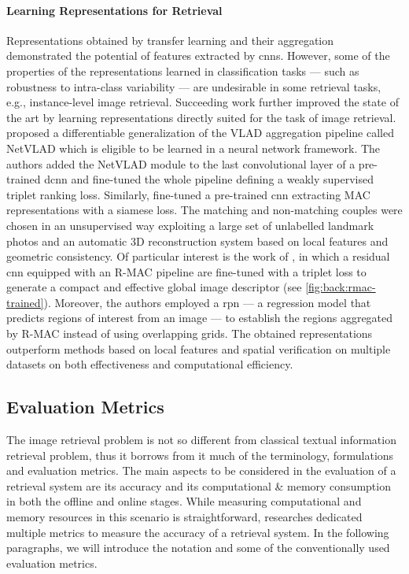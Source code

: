 \paragraph{Learning Representations for Retrieval}
Representations obtained by transfer learning and their aggregation demonstrated the potential of features extracted by \glspl{cnn}.
However, some of the properties of the representations learned in classification tasks --- such as robustness to intra-class variability --- are undesirable in some retrieval tasks, e.g., instance-level image retrieval.
Succeeding work further improved the state of the art by learning representations directly suited for the task of image retrieval.
\citet{arandjelovic2016netvlad} proposed a differentiable generalization of the VLAD aggregation pipeline called NetVLAD which is eligible to be learned in a neural network framework.
The authors added the NetVLAD module to the last convolutional layer of a pre-trained \gls{dcnn} and fine-tuned the whole pipeline defining a weakly supervised triplet ranking loss.
Similarly, \citet{radenovic2016cnn} fine-tuned a pre-trained \gls{cnn} extracting MAC representations with a siamese loss.
The matching and non-matching couples were chosen in an unsupervised way exploiting a large set of unlabelled landmark photos and an automatic 3D reconstruction system based on local features and geometric consistency.
Of particular interest is the work of \citet{gordo2016deep,gordo2017end}, in which a residual \gls{cnn} equipped with an R-MAC pipeline are fine-tuned with a triplet loss to generate a compact and effective global image descriptor (see \ref{fig:back:rmac-trained}).
Moreover, the authors employed a \gls{rpn} --- a regression model that predicts regions of interest from an image --- to establish the regions aggregated by R-MAC instead of using overlapping grids.
The obtained representations outperform methods based on local features and spatial verification on multiple datasets on both effectiveness and computational efficiency.

\subsection{Evaluation Metrics}
\label{subsec:back:ir-metrics}
The image retrieval problem is not so different from classical textual information retrieval problem, thus it borrows from it much of the terminology, formulations and evaluation metrics.
The main aspects to be considered in the evaluation of a retrieval system are its accuracy and its computational \& memory consumption in both the offline and online stages.
While measuring computational and memory resources in this scenario is straightforward, researches dedicated multiple metrics to measure the accuracy of a retrieval system.
In the following paragraphs, we will introduce the notation and some of the conventionally used evaluation metrics.

